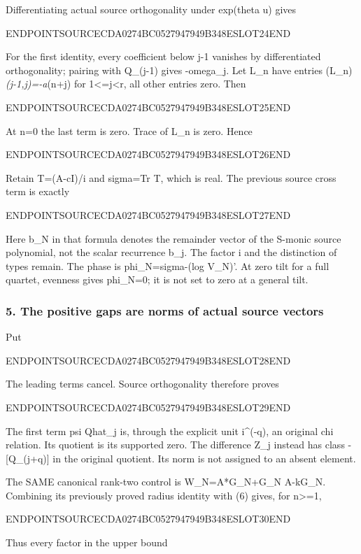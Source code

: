 Differentiating actual source orthogonality under exp(theta u) gives

ENDPOINTSOURCECDA0274BC0527947949B348ESLOT24END

For the first identity, every coefficient below j-1 vanishes by differentiated orthogonality; pairing with Q\_(j-1) gives -omega\_j. Let L\_n have entries (L\_n)\emph{(j-1,j)=-a}(n+j) for 1\textless=j\textless r, all other entries zero. Then

ENDPOINTSOURCECDA0274BC0527947949B348ESLOT25END

At n=0 the last term is zero. Trace of L\_n is zero. Hence

ENDPOINTSOURCECDA0274BC0527947949B348ESLOT26END

Retain T=(A-cI)/i and sigma=Tr T, which is real. The previous source cross term is exactly

ENDPOINTSOURCECDA0274BC0527947949B348ESLOT27END

Here b\_N in that formula denotes the remainder vector of the S-monic source polynomial, not the scalar recurrence b\_j. The factor i and the distinction of types remain. The phase is phi\_N=sigma-(log V\_N)'. At zero tilt for a full quartet, evenness gives phi\_N=0; it is not set to zero at a general tilt.

\subsubsection{5. The positive gaps are norms of actual source vectors}\label{endpoint-pr24_original--the-positive-gaps-are-norms-of-actual-source-vectors}

Put

ENDPOINTSOURCECDA0274BC0527947949B348ESLOT28END

The leading terms cancel. Source orthogonality therefore proves

ENDPOINTSOURCECDA0274BC0527947949B348ESLOT29END

The first term psi Qhat\_j is, through the explicit unit i\^{}(-q), an original chi relation. Its quotient is its supported zero. The difference Z\_j instead has class -{[}Q\_(j+q){]} in the original quotient. Its norm is not assigned to an absent element.

The SAME canonical rank-two control is W\_N=A*G\_N+G\_N A-kG\_N. Combining its previously proved radius identity with (6) gives, for n\textgreater=1,

ENDPOINTSOURCECDA0274BC0527947949B348ESLOT30END

Thus every factor in the upper bound

